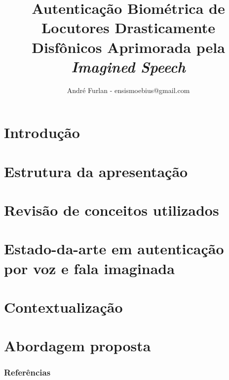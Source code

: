 

\title{Autenticação Biométrica de Locutores Drasticamente Disfônicos Aprimorada pela \textit{Imagined Speech}}


\author{André Furlan - ensismoebius@gmail.com}

\date{\the\year}


	
	\frame{\titlepage}
	
	\section{Introdução}
		

	\section{Estrutura da apresentação}
		

	\section{Revisão de conceitos utilizados}
		
		
		
		
		
		
	
	\section{Estado-da-arte em autenticação por voz e fala imaginada}
		
		
	\section{Contextualização}
		

	\section{Abordagem proposta}
		
		
	
	\begin{frame}[allowframebreaks]
		\frametitle{Referências}
		
	\end{frame}
	
